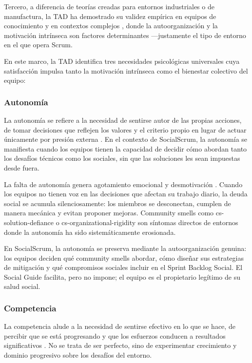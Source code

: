Tercero, a diferencia de teorías creadas para entornos industriales o de manufactura, la TAD ha demostrado su validez empírica en equipos de conocimiento y en contextos complejos \cite{ryan_self-determination_2000}, donde la autoorganización y la motivación intrínseca son factores determinantes —justamente el tipo de entorno en el que opera Scrum.

En este marco, la TAD identifica tres necesidades psicológicas universales cuya satisfacción impulsa tanto la motivación intrínseca como el bienestar colectivo del equipo:

\subsubsection{Autonomía}

La autonomía se refiere a la necesidad de sentirse autor de las propias acciones, de tomar decisiones que reflejen los valores y el criterio propio en lugar de actuar únicamente por presión externa \cite{ryan_self-determination_2000}. En el contexto de SocialScrum, la autonomía se manifiesta cuando los equipos tienen la capacidad de decidir cómo abordan tanto los desafíos técnicos como los sociales, sin que las soluciones les sean impuestas desde fuera.

La falta de autonomía genera agotamiento emocional y desmotivación \cite{tulili2022burnout}. Cuando los equipos no tienen voz en las decisiones que afectan su trabajo diario, la deuda social se acumula silenciosamente: los miembros se desconectan, cumplen de manera mecánica y evitan proponer mejoras. Community smells como \gls{cs-solution-defiance} o \gls{cs-organizational-rigidity} son síntomas directos de entornos donde la autonomía ha sido sistemáticamente erosionada.

En SocialScrum, la autonomía se preserva mediante la autoorganización genuina: los equipos deciden qué community smells abordar, cómo diseñar sus estrategias de mitigación y qué compromisos sociales incluir en el Sprint Backlog Social. El Social Guide facilita, pero no impone; el equipo es el propietario legítimo de su salud social.

\subsubsection{Competencia}

La competencia alude a la necesidad de sentirse efectivo en lo que se hace, de percibir que se está progresando y que los esfuerzos conducen a resultados significativos \cite{ryan_self-determination_2000}. No se trata de ser perfecto, sino de experimentar crecimiento y dominio progresivo sobre los desafíos del entorno.

